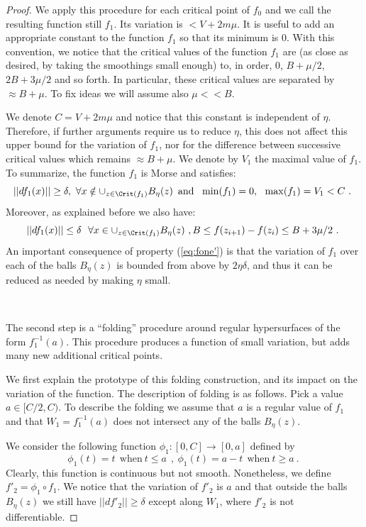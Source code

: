 \begin{proof}
We apply this procedure for each critical point of $f_{0}$ and we call the resulting function
still $f_{1}$. Its variation is  $ < V+2m\mu$.   
It is useful to add an appropriate constant to the function $f_{1}$ so that its minimum is $0$. 
With this convention, we notice that the critical values of the function $f_{1}$ are (as close as desired, by taking the smoothings small enough) to, in order, $0$,  $B+\mu/2$, $2B+3\mu/2$ and so forth. In particular, these critical values
are separated by $\approx B+\mu$. To fix ideas we will assume also $\mu << B$. 

We denote $C=V+2m\mu$ and notice that this constant is independent of $\eta$.  Therefore, if further arguments require us to reduce $\eta$, this does not affect this upper bound for the variation of $f_{1}$, nor for the difference between successive critical values which remains $\approx B+\mu$.  We denote by $V_{1}$ the maximal value of  $f_{1}$.
To summarize, the function $f_{1}$ is Morse and satisfies:
\begin{equation}\label{eq:fone}
||df_{1}(x)||\geq \delta, \ \forall x\notin \cup_{z\in \Crit(f_{1})}B_{\eta}(z)\,  \  \mathrm{and}\ \ \min(f_{1})=0,\ \  \max (f_{1})= V_{1} < C ~.~
\end{equation}
Moreover, as explained before we also have:
\begin{equation}\label{eq:fone'}
||df_{1}(x)||\leq \delta \ \ \forall x \in \cup_{z\in \Crit(f_{1})}B_{\eta}(z)\ , B\leq f(z_{i+1})-f(z_{i})\leq B + 3\mu/2~.~
\end{equation}
An important consequence of property (\ref{eq:fone'}) is that the variation
of $f_{1}$ over each of the balls $B_{\eta}(z)$ is bounded from above by
$2\eta\delta$, and thus it can be reduced as needed by making $\eta$ small.

\

The second step is a ``folding'' procedure around regular hypersurfaces of the form $f_{1}^{-1}(a)$. This procedure produces a function of small variation, but  adds
many new additional critical points.  

We first explain the prototype of this  folding construction, and its impact on the variation of the function. The description of folding is as follows. Pick a value $a\in [C/2, C)$. To describe the folding we assume that $a$ is a regular value of $f_{1}$ and that $W_{1}=f^{-1}_{1}(a)$ does not intersect any of the balls $B_{\eta}(z)$.

We consider the following function $\phi_{1}:[0, C]\to [0,a]$
defined by $$\phi_{1}(t)=t \ \ \mathrm{when}\  t \leq a \ \ , \ 
\phi_{1}(t)=a-t \ \ \mathrm{when}\  t\geq a~.~$$
Clearly, this function is continuous but not smooth. Nonetheless, we define $f'_{2}=\phi_{1}\circ f_{1}$. We notice that the variation of $f'_{2}$ is $a$ and that outside the 
balls $B_{\eta}(z)$ we still have $||df'_{2}||\geq \delta$ except along $W_{1}$, where 
$f'_{2}$ is not differentiable. 


\end{proof}
